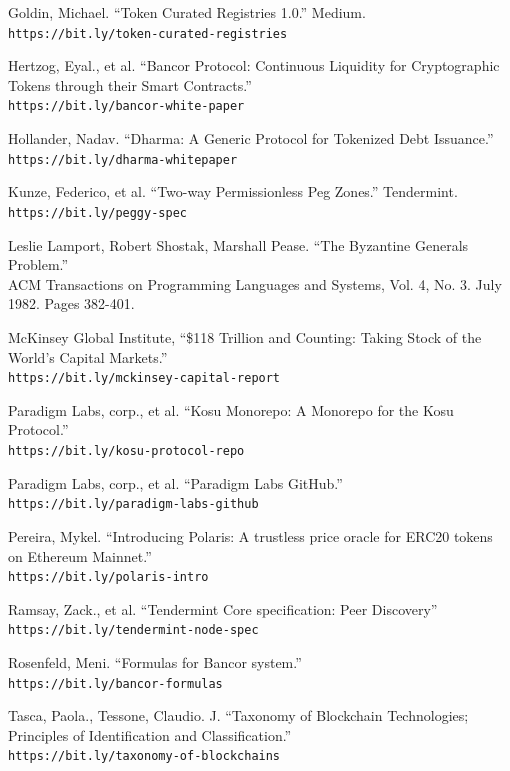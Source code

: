\documentclass[10pt]{article}
\begin{document}
\begin{thebibliography}{9}
Goldin, Michael. ``Token Curated Registries 1.0.'' Medium.
\\\texttt{https://bit.ly/token-curated-registries}

Hertzog,  Eyal., et al. ``Bancor Protocol: Continuous Liquidity for Cryptographic Tokens through their Smart Contracts.''
\\\texttt{https://bit.ly/bancor-white-paper}

Hollander, Nadav. ``Dharma: A Generic Protocol for Tokenized Debt Issuance.''
\\\texttt{https://bit.ly/dharma-whitepaper}

Kunze, Federico, et al. ``Two-way Permissionless Peg Zones.'' Tendermint.
\\\texttt{https://bit.ly/peggy-spec}

Leslie Lamport, Robert Shostak, Marshall Pease. ``The Byzantine Generals Problem.''
\\ACM Transactions on Programming Languages and Systems, Vol. 4, No. 3. July 1982. Pages 382-401.

McKinsey Global Institute, ``\$118 Trillion and Counting: Taking Stock of the World's Capital Markets.''
\\\texttt{https://bit.ly/mckinsey-capital-report}

Paradigm Labs, corp., et al. ``Kosu Monorepo: A Monorepo for the Kosu Protocol.''
\\\texttt{https://bit.ly/kosu-protocol-repo}

Paradigm Labs, corp., et al. ``Paradigm Labs GitHub.''
\\\texttt{https://bit.ly/paradigm-labs-github}

Pereira, Mykel. ``Introducing Polaris: A trustless price oracle for ERC20 tokens on Ethereum Mainnet.''
\\\texttt{https://bit.ly/polaris-intro}

Ramsay, Zack., et al. ``Tendermint Core specification: Peer Discovery''
\\\texttt{https://bit.ly/tendermint-node-spec}

Rosenfeld, Meni. ``Formulas for Bancor system.''
\\\texttt{https://bit.ly/bancor-formulas}

Tasca, Paola., Tessone, Claudio. J. ``Taxonomy of Blockchain Technologies; Principles of Identification and Classification.''
\\\texttt{https://bit.ly/taxonomy-of-blockchains}


\end{thebibliography}
\end{document}
